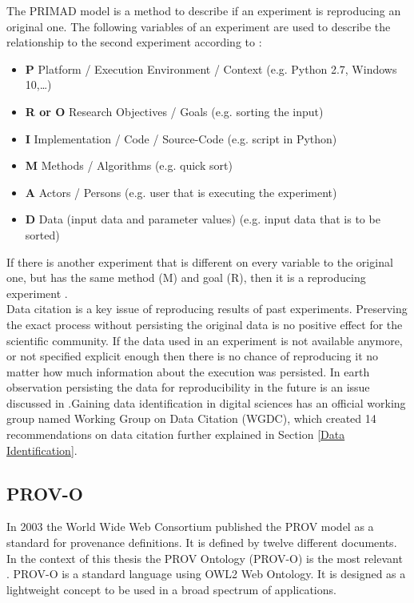 \documentclass[draft,final]{vutinfth} %
\begin{document}
The PRIMAD model is a method to describe if an experiment is reproducing an original one. The following variables of an experiment are used to describe the relationship to the second experiment according to \cite{primad}:

\begin{itemize}
	\item \textbf{P} Platform / Execution Environment / Context (e.g. Python 2.7, Windows 10,\dots) \\
	\item \textbf{R or O} Research Objectives / Goals (e.g. sorting the input) \\
	\item \textbf{I} Implementation / Code / Source-Code (e.g. script in Python) \\
	\item \textbf{M} Methods / Algorithms (e.g. quick sort) \\
	\item \textbf{A} Actors / Persons (e.g. user that is executing the experiment) \\
	\item \textbf{D} Data (input data and parameter values)   (e.g. input data that is to be sorted) 
\end{itemize}
If there is another experiment that is different on every variable to the original one, but has the same method (M) and goal (R), then it is a reproducing experiment \cite{primad}. 
\\  
Data citation is a key issue of reproducing results of past experiments. Preserving the exact process without persisting the original data is no positive effect for the scientific community. If the data used in an experiment is not available anymore, or not specified explicit enough then there is no chance of reproducing it no matter how much information about the execution was persisted. In earth observation persisting the data for reproducibility in the future is an issue discussed in \cite{6352411}.Gaining data identification in digital sciences has an official working group named Working Group on Data Citation (WGDC), which created 14 recommendations on data citation further explained in Section \ref{Data Identification}.

 \subsection{PROV-O}\label{PROV}
In 2003 the World Wide Web Consortium published the PROV model as a standard for provenance definitions. It is defined by twelve different documents. In the context of this thesis the PROV Ontology (PROV-O) is the most relevant \cite{provprimer}. 
PROV-O is a standard language using OWL2 Web Ontology. It is designed as a lightweight concept to be used in a broad spectrum of applications. 
\end{document}

